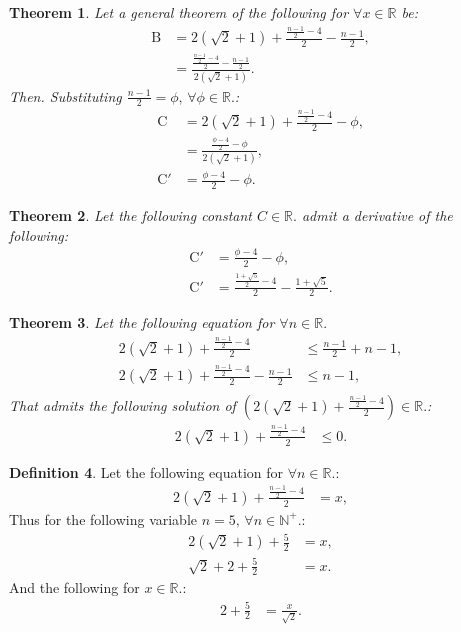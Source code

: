 \documentclass[10pt]{article}
\theoremstyle{plain}
\newtheorem{theorem}{Theorem}[section]
\theoremstyle{definition}
\newtheorem{definition}[theorem]{Definition}
\theoremstyle{remark}
\begin{document}
\begin{theorem}
	Let a general theorem of the following for $\forall x \in \mathbb{R}$ be:
	\begin{align*}
		\mathrm{B} &= 2(\sqrt{2} + 1) + \frac{\frac{n - 1}{2} - 4}{2} - \frac{n - 1}{2},\\
		&= \frac{\frac{\frac{n - 1}{2} - 4}{2} - \frac{n - 1}{2}}{2(\sqrt{2} + 1)}.
	\end{align*}
	Then. Substituting $\frac{n - 1}{2}=\phi, \, \forall \phi \in \mathbb{R}.$:
	\begin{align*}
		\mathrm{C} &= 2(\sqrt{2} + 1) + \frac{\frac{n - 1}{2} - 4}{2} - \phi,\\
		&= \frac{\frac{\phi - 4}{2} - \phi}{2(\sqrt{2} + 1)},\\
		\mathrm{C}' &= \frac{\phi - 4}{2} - \phi.
	\end{align*}
\end{theorem}

\begin{theorem}
	Let the following constant $C \in \mathbb{R}.$ admit a derivative of the following:
	\begin{align*}
		\mathrm{C}' &= \frac{\phi - 4}{2} - \phi,\\
		\mathrm{C}' &= \frac{\frac{1+\sqrt{5}}{2} - 4}{2} - \frac{1+\sqrt{5}}{2}.
	\end{align*}
\end{theorem}

\begin{theorem}
	Let the following equation for $\forall n \in \mathbb{R}.$
	\begin{align*}
		2(\sqrt{2} + 1) + \frac{\frac{n - 1}{2} - 4}{2}  &\leq \frac{n - 1}{2} + n - 1,\\
		2(\sqrt{2} + 1) + \frac{\frac{n - 1}{2} - 4}{2} - \frac{n - 1}{2} &\leq n - 1,\\
	\end{align*}
	 That admits the following solution of $(2(\sqrt{2} + 1) + \frac{\frac{n - 1}{2} - 4}{2}) \in \mathbb{R}.$:
	\begin{align*}
	 	2(\sqrt{2} + 1) + \frac{\frac{n - 1}{2} - 4}{2} &\leq 0.
	\end{align*}
\end{theorem}

\begin{definition}
	Let the following equation for $\forall n \in \mathbb{R}.$:
	\begin{align*}
		2(\sqrt{2} + 1) + \frac{\frac{n - 1}{2} - 4}{2} &= x,
	\end{align*}
	Thus for the following variable $n=5, \, \forall n \in \mathbb{N}^{+}.$:
	\begin{align*}
		2(\sqrt{2} + 1) + \frac{5}{2} &= x,\\
		\sqrt{2}+2 + \frac{5}{2} &= x.
	\end{align*}
	And the following for $x \in \mathbb{R}.$:
	\begin{align*}
		2+\frac{5}{2} &= \frac{x}{\sqrt{2}}.
	\end{align*}
\end{definition}
\end{document}
